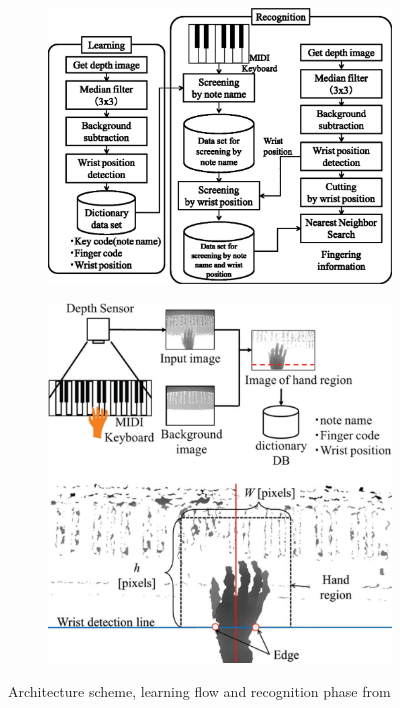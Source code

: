 \begin{figure}[ht]
	\centering
	\begin{subfigure}{0.55\textwidth}
		\centering
		\includegraphics[width=\textwidth]{images/related-work/fingering-recognition-scheme}
	\end{subfigure}
	\hfill
	\begin{subfigure}{0.43\textwidth}
		\centering
		\includegraphics[width=\textwidth]{images/related-work/fingering-recognition}
	\end{subfigure}
	\caption{Architecture scheme, learning flow and recognition phase from~\protect\cite{piano-fingering-recognition}}
	\label{fig:fingering-recognition}
\end{figure}

